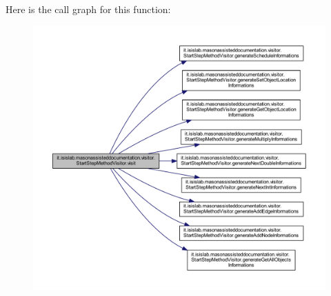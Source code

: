 Here is the call graph for this function\-:
\nopagebreak
\begin{figure}[H]
\begin{center}
\leavevmode
\includegraphics[width=350pt]{classit_1_1isislab_1_1masonassisteddocumentation_1_1visitor_1_1_start_step_method_visitor_a4796e11f1a29fb12db6f9500eac5adeb_cgraph}
\end{center}
\end{figure}





